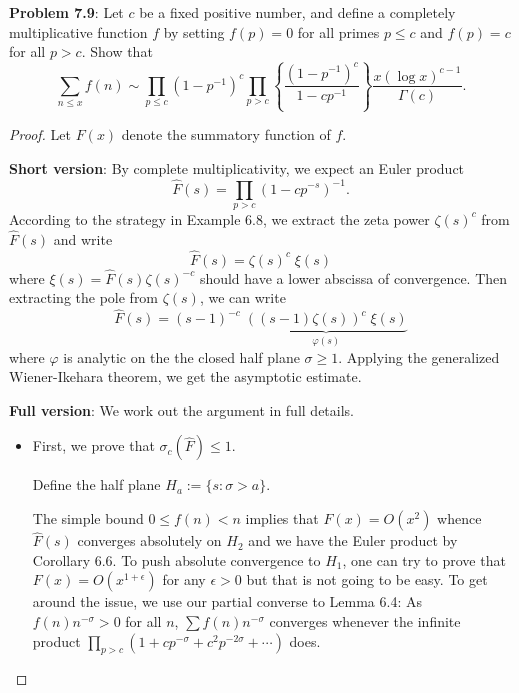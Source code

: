 \documentclass[12pt]{article}
\newcommand{\Fhat}{\widehat{F}}
\begin{document}
\fi

\textbf{Problem 7.9}: Let $c$ be a fixed positive number, and define a completely multiplicative function $f$ by setting $f(p) = 0$ for all primes $p \leq c$ and $f(p) = c$ for all $p > c$. Show that
$$\sum_{n \leq x} f(n) \sim \prod_{p \leq c} (1-p^{-1})^c \prod_{p > c} \left\{ \frac{(1 - p^{-1})^c}{1 - c p^{-1}} \right\} \frac{x(\log x)^{c - 1}}{\Gamma(c)}.$$

\begin{proof}
Let $F(x)$ denote the summatory function of $f$.

\textbf{Short version}: By complete multiplicativity, we expect an Euler product
$$\Fhat(s) = \prod_{p > c} (1 - c p^{-s})^{-1}.$$
According to the strategy in Example 6.8, we extract the zeta power $\zeta(s)^c$ from $\Fhat(s)$ and write
$$\Fhat(s) = \zeta(s)^c \; \xi(s)$$
where $\xi(s) = \Fhat(s) \zeta(s)^{-c}$ should have a lower abscissa of convergence. Then extracting the pole from $\zeta(s)$, we can write
$$\Fhat(s) = (s - 1)^{-c} \; \underbrace{((s - 1) \zeta(s))^c \; \xi(s)}_{\varphi(s)}$$
where $\varphi$ is analytic on the the closed half plane $\sigma \geq 1$. Applying the generalized Wiener-Ikehara theorem, we get the asymptotic estimate.

\textbf{Full version}: We work out the argument in full details.

\begin{itemize}
\item First, we prove that $\sigma_c(\Fhat) \leq 1$.

Define the half plane $H_a := \{s : \sigma > a\}$.

The simple bound $0 \leq f(n) < n$ implies that $F(x) = O(x^2)$ whence $\Fhat(s)$ converges absolutely on $H_2$ and we have the Euler product by Corollary 6.6.
To push absolute convergence to $H_1$, one can try to prove that $F(x) = O(x^{1+\epsilon})$ for any $\epsilon > 0$ but that is not going to be easy.
To get around the issue, we use our partial converse to Lemma 6.4: As $f(n) n^{-\sigma} > 0$ for all $n$, $\sum f(n) n^{-\sigma}$ converges whenever the infinite product $\prod_{p > c} (1 + c p^{-\sigma} + c^2 p^{-2\sigma} + \cdots)$ does.


\end{itemize}
\end{proof}
\end{document}

